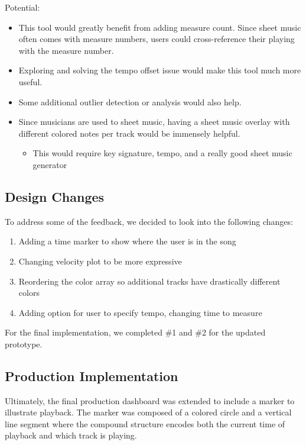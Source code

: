 \documentclass[journal]{vgtc}                %
\begin{document}
Potential:
\begin{itemize}
  \item This tool would greatly benefit from adding measure count. Since sheet
  music often comes with measure numbers, users could cross-reference their
  playing with the measure number.
  \item Exploring and solving the tempo offset issue would make this tool much
  more useful.
  \item Some additional outlier detection or analysis would also help.
  \item Since musicians are used to sheet music, having a sheet music overlay
  with different colored notes per track would be immensely helpful.
  \begin{itemize}
    \item This would require key signature, tempo, and a really good sheet music generator
  \end{itemize}
\end{itemize}

\subsection{Design Changes}

To address some of the feedback, we decided to look into the
following changes:

\begin{enumerate}
  \item Adding a time marker to show where the user is in the song
  \item Changing velocity plot to be more expressive
  \item Reordering the color array so additional tracks have drastically different colors
  \item Adding option for user to specify tempo, changing time to measure
\end{enumerate}

For the final implementation, we completed \#1 and \#2 for the updated prototype.

\subsection{Production Implementation}

Ultimately, the final production dashboard was extended to include a marker
to illustrate playback. The marker was composed of a colored circle and a vertical
line segment where the compound structure encodes both the current time of
playback and which track is playing.
\end{document}
